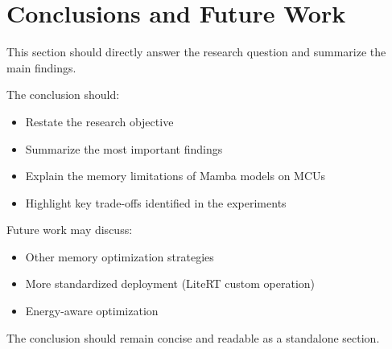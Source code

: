 \section{Conclusions and Future Work}
\label{sec:conclusion}

This section should directly answer the research question and summarize the main findings.

The conclusion should:
\begin{itemize}
  \item Restate the research objective
  \item Summarize the most important findings
  \item Explain the memory limitations of Mamba models on MCUs
  \item Highlight key trade-offs identified in the experiments
\end{itemize}

Future work may discuss:
\begin{itemize}
  \item Other memory optimization strategies
  \item More standardized deployment (LiteRT custom operation)
  \item Energy-aware optimization
\end{itemize}

The conclusion should remain concise and readable as a standalone section.
